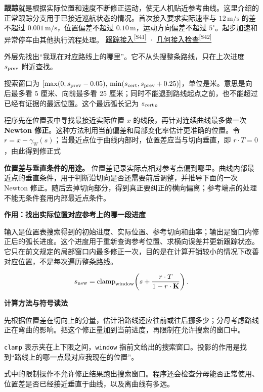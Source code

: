 \documentclass[12pt,a4paper]{article}
\numberwithin{equation}{topic}
\newcommand{\sourceref}[2]{\hyperlink{source-#1}{#2\textsuperscript{[#1]}}}
\begin{document}
\textbf{跟踪}就是根据实际位置和速度不断修正运动，使无人机贴近参考曲线。这里介绍的正常跟踪分支用于已接近巡航状态的情况。首次接入要求实际速率与 \(12\,\mathrm{m/s}\) 的差不超过 \(0.001\,\mathrm{m/s}\)，位置偏差不超过 \(0.10\,\mathrm m\)，运动方向偏差不超过 \(5^\circ\)。起步加速和异常停车由其他执行流程处理。 \sourceref{S41}{跟踪接入} · \sourceref{S42}{几何接入检查}

外层先找出“我现在对应路线上的哪里”。它不从头搜整条路线，只在上次进度 \(s_{\rm prev}\) 附近查找。

搜索窗口为 \([\max(0,s_{\rm prev}-0.05),\,\min(s_{\rm cert},s_{\rm prev}+0.25)]\)，单位是米。意思是向后最多看 5 厘米、向前最多看 25 厘米；同时不能退到路线起点之前，也不能超过已经有证据的最远位置。这个最远弧长记为 \(s_{\rm cert}\)。

程序先在位置表中寻找最接近实际位置 \(x\) 的线段，再针对连续曲线最多做一次 \textbf{Newton 修正}。这种方法利用当前偏差和局部变化率估计更准确的位置。令 \(r=x-\gamma_W(s)\)；当最近点位于曲线内部时，位置差应当与切向垂直，即 \(r\cdot T=0\)，由此得到修正式

\textbf{位置差与垂直条件的用途。} 位置差记录实际点相对参考点偏到哪里。曲线内部最近点的垂直条件，用于判断沿切向是否还需要前后调整，并推导下面的一次 Newton 修正。随后去掉切向部分，得到真正要纠正的横向偏离；参考端点的处理不能无条件套用内部最近点条件。

\noindent\textbf{作用：找出实际位置对应参考上的哪一段进度}\par\nobreak
输入是位置表搜索得到的初始进度、实际位置、参考切向和曲率；输出是窗口内修正后的弧长进度。这个进度用于重新查询参考位置、求横向误差并更新跟踪状态。它只在前文规定的局部窗口内最多修正一次，目的是在计算开销较小的情况下改善对应位置，不是每次遍历整条路线。

\begin{equation}
\label{eq:projection}
s_{\rm new}=\operatorname{clamp}_{\rm window}\!
\left(s+\frac{r\cdot T}{1-r\cdot\mathbf K}\right).
\end{equation}

\noindent\textbf{计算方法与符号读法}\par\nobreak
先根据位置差在切向上的分量，估计沿路线还应往前或往后挪多少；分母考虑路线正在弯曲的影响。把这个修正量加到当前进度，再限制在允许搜索的窗口中。

\texttt{clamp} 表示夹在上下限之间，\texttt{window} 指前文给出的搜索窗口。投影的作用是找到“路线上的哪一点最对应我现在的位置”。


式中的限制操作不允许修正结果跑出搜索窗口。程序还会检查分母能否正常使用、位置差是否已经接近垂直于曲线，以及离曲线有多远。
\end{document}
